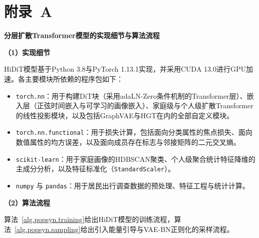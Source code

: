 
\setlength{\baselineskip}{16pt}
\chapter{附录~A}\label{appen.a}

\begin{center}
\textbf{分层扩散Transformer模型的实现细节与算法流程}
\end{center}

\textbf{（1）实现细节}

HiDiT模型基于Python 3.8与PyTorch 1.13.1实现，并采用CUDA 13.0进行GPU加速。各主要模块所依赖的程序包如下：

\begin{itemize}
  \item \texttt{torch.nn}：用于构建DiT块（采用adaLN-Zero条件机制的Transformer层）、嵌入层（正弦时间嵌入与可学习的画像嵌入）、家庭级与个人级扩散Transformer的线性投影模块，以及包括GraphVAE与HGT在内的全部自定义模块。
  \item \texttt{torch.nn.functional}：用于损失计算，包括面向分类属性的焦点损失、面向数值属性的均方误差，以及面向成员存在标志与邻接矩阵的二元交叉熵。
  \item \texttt{scikit-learn}：用于家庭画像的HDBSCAN聚类、个人级聚合统计特征降维的主成分分析，以及特征标准化（\texttt{StandardScaler}）。
  \item \texttt{numpy} 与 \texttt{pandas}：用于居民出行调查数据的预处理、特征工程与统计计算。
\end{itemize}

\textbf{（2）算法流程}

算法~\ref{alg.popsyn.training}给出HiDiT模型的训练流程，算法~\ref{alg.popsyn.sampling}给出引入能量引导与VAE-BN正则化的采样流程。

